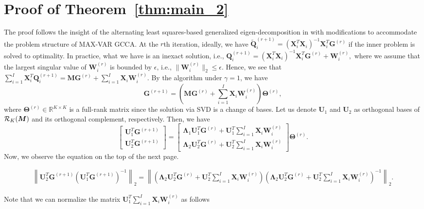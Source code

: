\documentclass[10pt,journal]{IEEEtran}
\newcommand{\G}{\boldsymbol{G}}
\newcommand{\Q}{\boldsymbol{Q}}
\newcommand{\X}{\boldsymbol{X}}
\newcommand{\U}{\boldsymbol{U}}
\newcommand{\M}{\boldsymbol{M}}
\begin{document}
\section{Proof of Theorem~\ref{thm:main_2}}
The proof follows the insight of the alternating least squares-based generalized eigen-decomposition in \cite{lu2014large} with modifications to accommodate the problem structure of MAX-VAR GCCA.
At the $r$th iteration, ideally, we have
${\tilde{\bm Q}_i^{(r+1)}}= ({\bm X}_i^T{\bm X}_i)^{-1}{\bm X}_i^T{\bm G}^{(r)}$
if the inner problem is solved to optimality.
In practice, what we have is an inexact solution, i.e.,
${\Q}_i^{(r+1)}= ({\bm X}_i^T{\bm X}_i)^{-1}{\bm X}_i^T{\bm G}^{(r)} + {\bm W}_i^{(r)},$
where we assume that the largest singular value of ${\bm W}_i^{(r)}$ is bounded by $\epsilon$, i.e., $\|{\bm W}_i^{(r)}\|_2\leq\epsilon$.
Hence, we see that
$\sum_{i=1}^I{\bm X}_i^T\Q_i^{(r+1)} = \M\G^{(r)} + \sum_{i=1}^I \X_i{\bm W}_i^{(r)}.$
By the algorithm under $\gamma = 1$, we have
\[\G^{(r+1)} =   \left(\M\G^{(r)} + \sum_{i=1}^I \X_i{\bm W}_i^{(r)}\right) {\bm \Theta}^{(r)},\]
where ${\bm \Theta}^{(r)}\in\mathbb{R}^{K\times K}$ is a full-rank matrix since the solution via SVD is a change of  bases.
Let us denote $\bm U_1$ and $\bm U_2$ as orthogonal bases of ${\cal R}_K(\M)$ and its orthogonal complement, respectively.
Then, we have
\begin{equation}
\begin{bmatrix}
\U_1^T\G^{(r+1)}\\ \U_2^T\G^{(r+1)}
\end{bmatrix}
=
\begin{bmatrix}
\bm \Lambda_1 \U_1^T\G^{(r)} + \U_1^T  \sum_{i=1}^I \X_i{\bm W}_i^{(r)} \\ \bm \Lambda_2 \U_2^T\G^{(r)} + \U_2^T  \sum_{i=1}^I \X_i{\bm W}_i^{(r)}
\end{bmatrix}
{\bm \Theta}^{(r)}.
\end{equation}
Now, we observe the equation on the top of the next page.
\begin{figure}[t]
\begin{align}
\left\| \U_2^T\G^{(r+1)}\left( \U_1^T\G^{(r+1)} \right)^{-1}  \right\|_2 = \left\|\left(\bm \Lambda_2 \U_2^T\G^{(r)} + \U_2^T  \sum_{i=1}^I \X_i{\bm W}_i^{(r)} \right)\left(\bm \Lambda_2 \U_2^T\G^{(r)} + \U_2^T  \sum_{i=1}^I \X_i{\bm W}_i^{(r)}  \right)^{-1}\right\|_2.
\end{align}
\hrulefill
\end{figure}
Note that we can normalize the matrix $\U_1^T  \sum_{i=1}^I \X_i{\bm W}_i^{(r)}$ as follows
\end{document}
